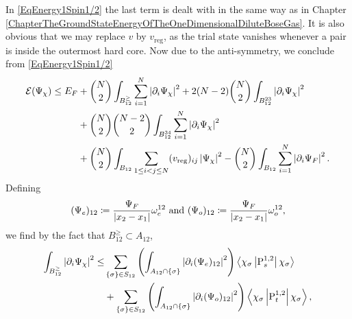 In \eqref{EqEnergy1Spin1/2} the last term is dealt with in the same way as in Chapter \ref{ChapterTheGroundStateEnergyOfTheOneDimensionalDiluteBoseGas}. It is also obvious that we may replace $ v $ by $ v_{\text{reg}} $, as the trial state vanishes whenever a pair is inside the outermost hard core. Now due to the anti-symmetry, we conclude from \eqref{EqEnergy1Spin1/2}
\begin{equation}\label{EqEnergy2Spin1/2}
\begin{aligned}
\mathcal{E}(\Psi_{\chi})\leq E_F&+\binom{N}{2}\int_{B_{12}^{\geq}}\sum_{i=1}^{N}\left\lvert \partial_i\Psi_{\chi} \right\rvert^2+2(N-2)\binom{N}{2}\int_{B_{12}^{23}}\left\lvert \partial_i\Psi_{\chi} \right\rvert^2\\
&+\binom{N}{2}\binom{N-2}{2}\int_{B_{12}^{34}}\sum_{i=1}^{N}\left\lvert \partial_i\Psi_{\chi} \right\rvert^2\\
&+\binom{N}{2}\int_{B_{12}}\sum_{1\leq i<j\leq N}(v_{\text{reg}})_{ij}\left\lvert \Psi_{\chi} \right\rvert^2-\binom{N}{2}\int_{B_{12}}\sum_{i=1}^{N}\left\lvert \partial_i \Psi_F \right\rvert^2.
\end{aligned}
\end{equation}
Defining \begin{equation}
\begin{aligned}
(\Psi_e)_{12}\coloneqq\frac{\Psi_F}{\left\lvert x_2-x_1 \right\rvert}\omega_e^{12}\text{ and } (\Psi_o)_{12}\coloneqq\frac{\Psi_F}{\left\lvert x_2-x_1 \right\rvert}\omega_o^{12},
\end{aligned}
\end{equation}
we find by the fact that $ B_{12}^\geq\subset A_{12} $, \begin{equation}\label{EqEnergy3Spin1/2}
\begin{aligned}
\int_{B_{12}^{\geq}}\left\lvert \partial_i\Psi_{\chi} \right\rvert^2\leq&\sum_{\{\sigma\}\in S_{12}}\left(\int_{A_{12}\cap\{\sigma\}}\left\lvert \partial_i(\Psi_e)_{12} \right\rvert^2\right)\left\langle\chi_{\sigma} \left\lvert \operatorname{P}^{1,2}_s  \right\rvert \chi_\sigma\right\rangle\\
&+\sum_{\{\sigma\}\in S_{12}}\left(\int_{A_{12}\cap \{\sigma\}}\left\lvert \partial_i(\Psi_o)_{12} \right\rvert^2\right)\left\langle\chi_{\sigma} \left\lvert \operatorname{P}^{1,2}_t  \right\rvert \chi_\sigma\right\rangle,
\end{aligned}
\end{equation}
